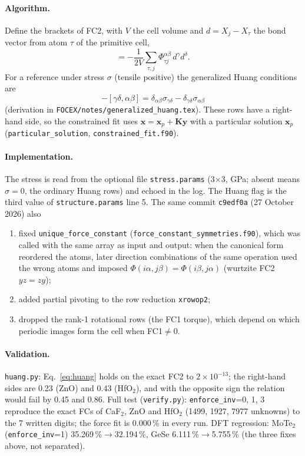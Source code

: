 \documentclass[11pt,a4paper]{article}
\newcommand{\bK}{\mathbf K}
\newcommand{\bx}{\mathbf x}
\newcommand{\by}{\mathbf y}
\newcommand{\code}[1]{\texttt{#1}}
\begin{document}
\paragraph{Algorithm.} Define the brackets of FC2, with $V$ the cell volume and $d=X_j-X_\tau$ the bond
vector from atom $\tau$ of the primitive cell,
\begin{equation}
[\alpha\beta,\gamma\delta]=-\frac1{2V}\sum_{\tau,j}\Phi^{\alpha\beta}_{\tau j}\,d^\gamma d^\delta .
\label{eq:bracket}
\end{equation}
For a reference under stress $\sigma$ (tensile positive) the generalized Huang conditions are
\begin{equation}
[\alpha\beta,\gamma\delta]-[\gamma\delta,\alpha\beta]=\delta_{\alpha\beta}\sigma_{\gamma\delta}-\delta_{\gamma\delta}\sigma_{\alpha\beta}
\label{eq:huang}
\end{equation}
(derivation in \code{FOCEX/notes/generalized\_huang.tex}). These rows have a right-hand side, so the
constrained fit uses $\bx=\bx_p+\bK\by$ with a particular solution $\bx_p$ (\code{particular\_solution},
\code{constrained\_fit.f90}).

\paragraph{Implementation.} The stress is read from the optional file \code{stress.params} (3$\times$3, GPa;
absent means $\sigma=0$, the ordinary Huang rows) and echoed in the log. The Huang flag is the third value
of \code{structure.params} line 5. The same commit \code{c9edf0a} (27 October 2026) also
\begin{enumerate}
\item fixed \code{unique\_force\_constant} (\code{force\_constant\_symmetries.f90}), which was called with
the same array as input and output: when the canonical form reordered the atoms, later direction
combinations of the same operation used the wrong atoms and imposed
$\Phi(i\alpha,j\beta)=\Phi(i\beta,j\alpha)$ (wurtzite FC2 $yz=zy$);
\item added partial pivoting to the row reduction \code{xrowop2};
\item dropped the rank-1 rotational rows (the FC1 torque), which depend on which periodic images form the
cell when FC1$\neq0$.
\end{enumerate}

\paragraph{Validation.} \code{huang.py}: Eq.~\eqref{eq:huang} holds on the exact FC2 to
$2\times10^{-13}$; the right-hand sides are 0.23 (ZnO) and 0.43 (HfO$_2$), and with the opposite sign the
relation would fail by 0.45 and 0.86. Full test (\code{verify.py}): \code{enforce\_inv}=0, 1, 3 reproduce
the exact FCs of CaF$_2$, ZnO and HfO$_2$ (1499, 1927, 7977 unknowns) to the 7 written digits; the force
fit is 0.000\,\% in every run. DFT regression: MoTe$_2$ (\code{enforce\_inv}=1) 35.269\,\%$\to$32.194\,\%,
GeSe 6.111\,\%$\to$5.755\,\% (the three fixes above, not separated).
\end{document}

